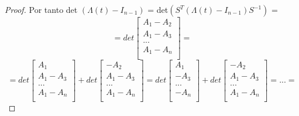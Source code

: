 \begin{lem}
\begin{proof}
	           Por tanto det $(\Lambda(t) - I_{n-1})$ = det$(S^{T}(\Lambda(t) - I_{n-1})S^{-1})$ = 
	           \[=det\begin{bmatrix}
	           A_{1} - A_{2} \\
	           A_{1} - A_{3} \\
	           ... \\	
	           A_{1} - A_{n} \\
	           \end{bmatrix}=\]
	           \[=det\begin{bmatrix}
	           A_{1} \\
	           A_{1} - A_{3} \\
	           ... \\	
	           A_{1} - A_{n} \\
	           \end{bmatrix} + det\begin{bmatrix}
	           - A_{2} \\
	           A_{1} - A_{3} \\
	           ... \\	
	           A_{1} - A_{n} \\
	           \end{bmatrix} =det\begin{bmatrix}
	           A_{1} \\
	           - A_{3} \\
	           ... \\	
	           - A_{n} \\
	           \end{bmatrix} + det\begin{bmatrix}
	           - A_{2} \\
	           A_{1} - A_{3} \\
	           ... \\	
	           A_{1} - A_{n} \\
	           \end{bmatrix}=...=\]
	           

\end{proof}
\end{lem}
